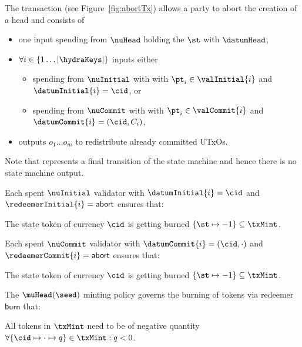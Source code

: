 The \mtxAbort{} transaction (see Figure~\ref{fig:abortTx}) allows a
party to abort the creation of a head and consists of
\begin{itemize}
  \item one input spending from $\nuHead$ holding the $\st$ with $\datumHead$,
  \item $\forall i \in \{1 \dots |\hydraKeys|\}$ inputs either
  \begin{itemize}
	\item spending from $\nuInitial$ with with $\pt_{i} \in \valInitial{i}$ and $\datumInitial{i} = \cid$, or
	\item spending from $\nuCommit$ with with $\pt_{i} \in \valCommit{i}$ and $\datumCommit{i} = (\cid, C_{i})$,
  \end{itemize}
  \item outputs $o_{1} \dots o_{m}$ to redistribute already committed UTxOs.
\end{itemize}

Note that \mtxAbort{} represents a final transition of the state
machine and hence there is no state machine output.

\noindent Each spent $\nuInitial$ validator with $\datumInitial{i} = \cid$ and $\redeemerInitial{i} = \mathsf{abort}$ ensures that:
\begin{menumerate}
  \item The state token of currency $\cid$ is getting burned $\{\st \mapsto -1\} \subseteq \txMint$.
\end{menumerate}

\noindent Each spent $\nuCommit$ validator with $\datumCommit{i} = (\cid,\cdot)$ and $\redeemerCommit{i} = \mathsf{abort}$ ensures that:
\begin{menumerate}
  \item The state token of currency $\cid$ is getting burned $\{\st \mapsto -1\} \subseteq \txMint$.
\end{menumerate}

\noindent The $\muHead(\seed)$ minting policy governs the burning of tokens via
redeemer $\mathsf{burn}$ that:
\begin{menumerate}
  \item All tokens in $\txMint$ need to be of negative quantity
  $\forall \{\cid \mapsto \cdot \mapsto q\} \in \txMint : q < 0$.
\end{menumerate}

